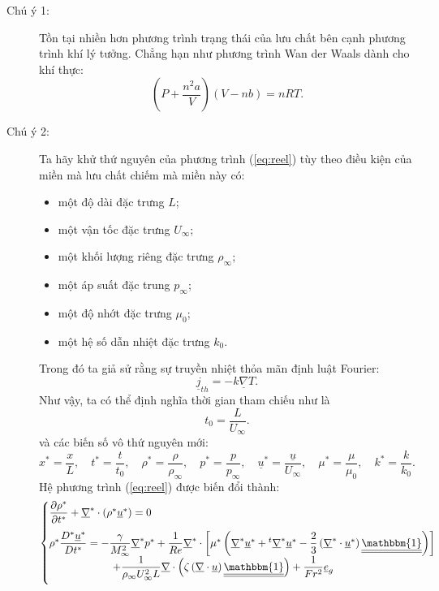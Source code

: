 \begin{description}
	\item[Chú ý 1:] Tồn tại nhiền hơn phương trình trạng thái của lưu chất bên cạnh phương trình khí lý tưởng. Chẳng hạn như phương trình Wan der Waals dành cho khí thực:
        \[
            \left(P+\dfrac{n^2a}{V}\right)\left(V-nb\right)=nRT.
        \]
	\item[Chú ý 2:] Ta hãy khử thứ nguyên của phương trình (\ref{eq:reel}) tùy theo điều kiện của miền mà lưu chất chiếm mà miền này có:
	\begin{itemize}
		\item một độ dài đặc trưng $L$;
		\item một vận tốc đặc trưng $U_\infty$;
		\item một khối lượng riêng đặc trưng $\rho_\infty$;
		\item một áp suất đặc trung $p_\infty$;
		\item một độ nhớt đặc trưng $\mu_0$;
		\item một hệ số dẫn nhiệt đặc trưng $k_0$.
	\end{itemize}
	Trong đó ta giả sử rằng sự truyền nhiệt thỏa mãn định luật Fourier:
        \[
            \underline{j}_{th}=-k\underline{\nabla}T.
        \]
	Như vậy, ta có thể định nghĩa thời gian tham chiếu như là
        \[
            t_0 =\dfrac{L}{U_\infty}.
        \]
	và các biến số vô thứ nguyên mới:
        \[
            x^*=\dfrac{x}{L},\quad t^*=\dfrac{t}{t_0},\quad\rho^*=\dfrac{\rho}{\rho_\infty},\quad p^*=\dfrac{p}{p_\infty},\quad\underline{u}^*=\dfrac{\underline{u}}{U_\infty},\quad\mu^*=\dfrac{\mu}{\mu_0},\quad k^*=\dfrac{k}{k_0}.
        \]
	Hệ phương trình (\ref{eq:reel}) được biến đổi thành:
        \[
            \begin{aligned}
                \begin{cases}
                    \dfrac{\partial\rho^*}{\partial t^*}+\underline{\nabla}^*\cdot\left(\rho^*\underline{u}^*\right)=0\\[10pt]
                    \rho^*\dfrac{D^*\underline{u}^*}{Dt^*}=-\dfrac{\gamma}{M^2_\infty}\underline{\nabla}^* p^*+\dfrac{1}{Re} \underline{\nabla}^*\cdot\left[\mu^*\left(\underline{\nabla}^* \underline{u}^*+{}^t\underline{\nabla}^* \underline{u}^*-\dfrac{2}{3}\left(\underline{\nabla}^*\cdot\underline{u}^*\right) \underline{\underline{\mathbbm{1}}}\right)\right]&\\
                    \qquad\qquad\qquad+\dfrac{1}{\rho_\infty U_\infty^2L} \underline{\nabla}\cdot\left(\zeta\left(\underline{\nabla}\cdot\underline{u}\right)\underline{\underline{\mathbbm{1}}}\right)+\dfrac{1}{Fr^2}\underline{e}_g&\\[10pt]

\end{cases}
\end{aligned}\]
\end{description}
